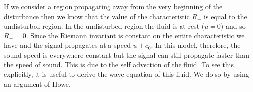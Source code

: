 If we consider a region propagating away from the very beginning of the disturbance then
we know that the value of the characteristic $R_-$ is equal to the undisturbed region.
In the undisturbed region the fluid is at rest ($u=0$) and so $R_- = 0$.
Since the Riemann invariant is constant on the entire characteristic we have
and the signal propagates at a speed $u + c_0$.
%
In this model, therefore, the sound speed is everywhere constant
but the signal can still propagate faster than the speed of sound.
This is due to the self advection of the fluid.
To see this explicitly, it is useful to derive the wave equation of this fluid.
We do so by using an argument of Howe\cite{}.
%


